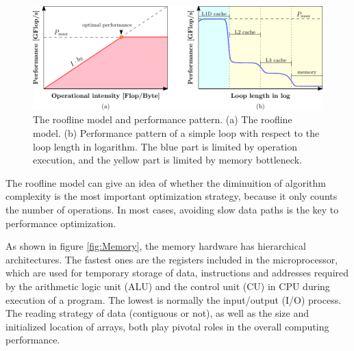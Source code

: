 \begin{figure}[h]
\begin{centering}
\includegraphics[width=1\columnwidth]{_figure/roofline}
\par\end{centering}

\caption[The roofline model and performance pattern]{The roofline model and performance pattern. (a) The roofline model.
(b) Performance pattern of a simple loop with respect to the loop
length in logarithm. The blue part is limited by operation execution,
and the yellow part is limited by memory bottleneck. \label{fig:The-roofline-model}}
\end{figure}


The roofline model can give an idea of whether the diminuition of
algorithm complexity is the most important optimization strategy,
because it only counts the number of operations. In most cases, avoiding
slow data paths is the key to performance optimization.

As shown in figure \ref{fig:Memory}, the memory hardware has hierarchical
architectures. The fastest ones are the registers included in the
microprocessor, which are used for temporary storage of data, instructions
and addresses required by the arithmetic logic unit (ALU) and the
control unit (CU) in CPU during execution of a program. The lowest
is normally the input/output (I/O) process. The reading strategy of
data (contiguous or not), as well as the size and initialized location
of arrays, both play pivotal roles in the overall computing performance.

